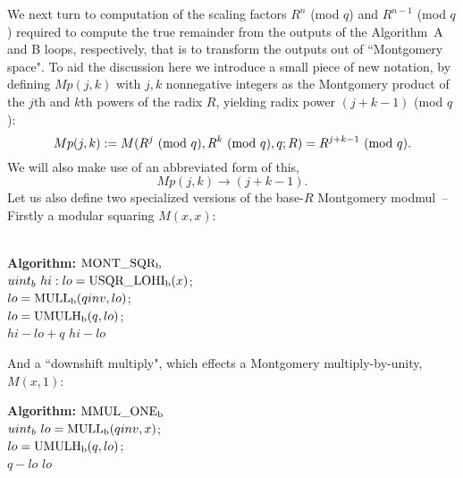 \documentclass{article}
\newcommand \ra {\rightarrow}
\begin{document}
We next turn to computation of the scaling factors $R^n$ (mod $q$) and $R^{n-1}$ (mod $q$) required to compute the true remainder from the outputs of the Algorithm~A and B loops, respectively, that is to transform the outputs out of ``Montgomery space". To aid the discussion here we introduce a small piece of new notation, by defining $Mp(j,k)$ with $j,k$ nonnegative integers as the Montgomery product of the $j$th and $k$th powers of the radix $R$, yielding radix power $(j+k-1)$ (mod $q$):
$$
	Mp(j,k) := M(R^j\ ({\rm mod}\ q), R^k\ ({\rm mod}\ q), q; R) = R^{j+k-1}\ ({\rm mod}\ q) .
$$
We will also make use of an abbreviated form of this,
$$
	Mp(j,k) \ra (j+k-1) .
$$
Let us also define two specialized versions of the base-$R$ Montgomery modmul~-- Firstly a modular squaring $M(x,x)$:\\
\\
\begin{algorithm}[H]
\LinesNotNumbered
{\bf Algorithm:} {${\rm MONT\_SQR_b}$}\\
\vspace{0.1in}
{
	$uint_b\ hi:lo = {\rm USQR\_LOHI_b}(x)$;\\
	$lo = {\rm MULL_b}(qinv, lo)$;\\
	$lo = {\rm UMULH_b}(   q, lo)$;\\
	 {
		\Return $hi - lo + q$\;
	}{
		\Return $hi - lo$\;
	}
}
\label{MS}
\end{algorithm}


\vspace{0.1in}
\noindent And a ``downshift multiply", which effects a Montgomery multiply-by-unity, $M(x,1)$:\\

\begin{algorithm}[H]
\LinesNotNumbered
{\bf Algorithm:} {${\rm MMUL\_ONE_b}$}\\
\vspace{0.1in}
{
	$uint_b\ lo = {\rm MULL_b}(qinv, x)$;\\
	$lo = {\rm UMULH_b}(   q, lo)$;\\
	 {
		\Return $q - lo$\;
	}{
		\Return $lo$\;
	}
}
\label{MUM}
\end{algorithm}
\vspace{0.1in}
\end{document}
